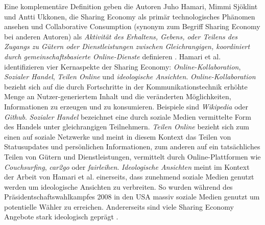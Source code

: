 \documentclass[a4paper]{scrartcl}
\begin{document}
\begin{multicols}{2}
			Eine komplement\"are Definition geben die Autoren Juho Hamari, Mimmi Sj\"oklint und Antti Ukkonen, die Sharing Economy als prim\"ar technologisches Ph\"anomen ansehen und Collaborative Consumption (synonym zum Begriff Sharing Economy bei anderen Autoren) als \glqq\textit{Aktivit\"at des Erhaltens, Gebens, oder Teilens des Zugangs zu G\"utern oder Dienstleistungen zwischen Gleichrangigen, koordiniert durch gemeinschaftsbasierte Online-Dienste\grqq} definieren \cite{doi:10.1002/asi.23552}. Hamari et al. identifizieren vier Kernaspekte der Sharing Economy: \textit{Online-Kollaboration}, \textit{Sozialer Handel}, \textit{Teilen Online} und \textit{ideologische Ansichten}. \textit{Online-Kollaboration} bezieht sich auf die durch Fortschritte in der Kommunikationstechnik erh\"ohte Menge an Nutzer-generiertem Inhalt und die ver\"anderten M\"oglichkeiten, Informationen zu erzeugen und zu konsumieren. Beispiele sind \textit{Wikipedia} oder \textit{Github}.
			\textit{Sozialer Handel} bezeichnet eine durch soziale Medien vermittelte Form des Handels unter gleichrangigen Teilnehmern.
			\textit{Teilen Online} bezieht sich zum einen auf soziale Netzwerke und meint in diesem Kontext das Teilen  von Statusupdates und pers\"onlichen Informationen, zum anderen auf ein tats\"achliches Teilen von G\"utern und  Dienstleistungen, vermittelt durch Online-Plattformen wie \textit{Couchsurfing}, \textit{car2go} oder \textit{fairleihen}. 
			\textit{Ideologische Ansichten} meint im Kontext  der Arbeit von Hamari et al. einerseits, dass zunehmend soziale Medien genutzt werden um ideologische Ansichten zu verbreiten. So wurden w\"ahrend des Pr\"asidentschaftswahlkampfes 2008 in den USA massiv soziale Medien genutzt um potentielle W\"ahler zu erreichen. Andererseits sind viele Sharing Economy Angebote stark ideologisch gepr\"agt \cite{doi:10.1002/asi.23552}. 
	 
	 

\end{multicols}
\end{document}
